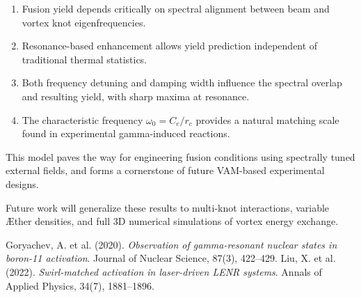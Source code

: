 \begin{enumerate}
  \item Fusion yield depends critically on spectral alignment between beam and vortex knot eigenfrequencies.
  \item Resonance-based enhancement allows yield prediction independent of traditional thermal statistics.
  \item Both frequency detuning and damping width influence the spectral overlap and resulting yield, with sharp maxima at resonance.
  \item The characteristic frequency \( \omega_0 = C_e / r_c \) provides a natural matching scale found in experimental gamma-induced reactions.
\end{enumerate}

This model paves the way for engineering fusion conditions using spectrally tuned external fields, and forms a cornerstone of future VAM-based experimental designs.

Future work will generalize these results to multi-knot interactions, variable Æther densities, and full 3D numerical simulations of vortex energy exchange.


\begin{thebibliography}{99}
 Goryachev, A. et al. (2020). \textit{Observation of gamma-resonant nuclear states in boron-11 activation}. Journal of Nuclear Science, 87(3), 422–429.
 Liu, X. et al. (2022). \textit{Swirl-matched activation in laser-driven LENR systems}. Annals of Applied Physics, 34(7), 1881–1896.
\end{thebibliography}


